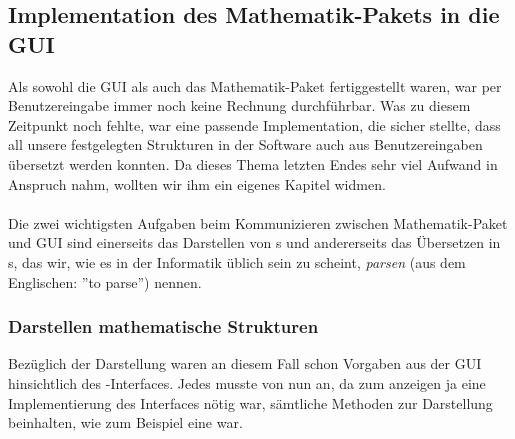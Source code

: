 \subsection{Implementation des Mathematik-Pakets in die GUI}
Als sowohl die GUI als auch das Mathematik-Paket fertiggestellt waren, war per Benutzereingabe immer noch keine Rechnung durchführbar. Was zu diesem Zeitpunkt noch fehlte, war eine passende Implementation, die sicher stellte, dass all unsere festgelegten Strukturen in der Software auch aus Benutzereingaben übersetzt werden konnten. Da dieses Thema letzten Endes sehr viel Aufwand in Anspruch nahm, wollten wir ihm ein eigenes Kapitel widmen.\\
\\
Die zwei wichtigsten Aufgaben beim Kommunizieren zwischen Mathematik-Paket und GUI sind einerseits das Darstellen von s und andererseits das Übersetzen in s, das wir, wie es in der Informatik üblich sein zu scheint, \textit{parsen} (aus dem Englischen: ''to parse'') nennen.

\subsubsection{Darstellen mathematische Strukturen}
Bezüglich der Darstellung waren an diesem Fall schon Vorgaben aus der GUI hinsichtlich des -Interfaces. Jedes  musste von nun an, da zum anzeigen ja eine Implementierung des Interfaces nötig war, sämtliche Methoden zur Darstellung beinhalten, wie zum Beispiel  eine war.